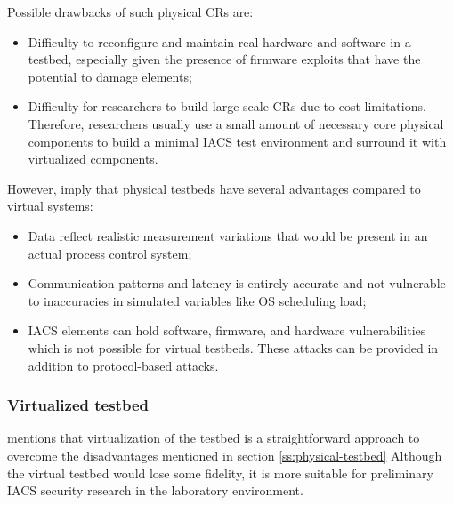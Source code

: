 Possible drawbacks of such physical CRs are:

\begin{itemize}
	\item Difficulty to reconfigure and maintain real hardware and software in a testbed, especially given the presence of firmware exploits that have the potential to damage elements;
	
	\item Difficulty for researchers to build large-scale CRs due to cost limitations. Therefore, researchers usually use a small amount of necessary core physical components to build a minimal IACS test environment and surround it with virtualized components.
	
\end{itemize}

However, \citeauthor{03-testbeds} \parencite{03-testbeds} imply that physical testbeds have several advantages compared to virtual systems:

\begin{itemize}
	\item Data reflect realistic measurement variations that would be present in an actual process control system;
	
	\item Communication patterns and latency is entirely accurate and not vulnerable to inaccuracies in simulated variables like OS scheduling load;
	
	\item  IACS elements can hold software, firmware, and hardware vulnerabilities which is not possible for virtual testbeds. These attacks can be provided in addition to protocol-based attacks.
\end{itemize}

\subsubsection{Virtualized testbed} \label{subsec:virtual}

\citeauthor{06-testbed} \parencite{06-testbed} mentions that virtualization of the testbed is a straightforward approach to overcome the disadvantages mentioned in section \ref{ss:physical-testbed} Although the virtual testbed would lose some fidelity, it is more suitable for preliminary IACS security research in the laboratory environment. 

